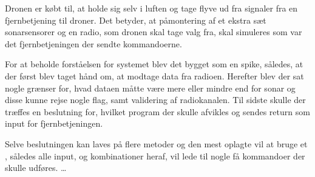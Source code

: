 \documentclass[Main]{subfiles}
\begin{document}
Dronen er købt til, at holde sig selv i luften og tage flyve ud fra signaler fra en fjernbetjening til droner.
Det betyder, at påmontering af et ekstra sæt sonarsensorer og en radio, som dronen skal tage valg fra, skal simuleres som var det fjernbetjeningen der sendte kommandoerne.

For at beholde forståelsen for systemet blev det bygget som en spike, således, at der først blev taget hånd om, at modtage data fra radioen.
Herefter blev der sat nogle grænser for, hvad dataen måtte være mere eller mindre end for sonar og disse kunne rejse nogle flag, samt validering af radiokanalen.
Til sidste skulle der træffes en beslutning for, hvilket program der skulle afvikles og sendes return som input for fjernbetjeningen.

Selve beslutningen kan laves på flere metoder og den mest oplagte vil at bruge et , således alle input, og kombinationer heraf, vil lede til nogle få kommandoer der skulle udføres.
\dots
\end{document}
